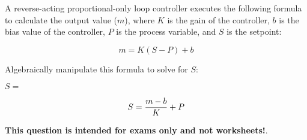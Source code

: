 

A reverse-acting proportional-only loop controller executes the following formula to calculate the output value ($m$), where $K$ is the gain of the controller, $b$ is the bias value of the controller, $P$ is the process variable, and $S$ is the setpoint:

$$m = K(S - P) + b$$

Algebraically manipulate this formula to solve for $S$:

\vskip 20pt

$S = $







$$S = {m - b \over K} + P$$







{\bf This question is intended for exams only and not worksheets!}.



